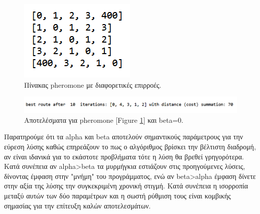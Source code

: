 \begin{figure}
    \centering
    \includegraphics[scale=1]{2947_thesis/pictures/pheromone.png} 
    \caption{Πίνακας pheromone με διαφορετικές επιρροές.}
    \label{15}
\end{figure}
\begin{figure}
    \centering
    \includegraphics[scale=0.65]{2947_thesis/pictures/ex3.png} 
    \caption{Αποτελέσματα για pheromone [Figure \ref{15}] και beta=0.}
    \label{16}
\end{figure}
Παρατηρούμε ότι τα alpha και beta αποτελούν σημαντικούς παράμετρους για την εύρεση λύσης καθώς επηρεάζουν το πως ο αλγόριθμος βρίσκει την βέλτιστη διαδρομή, αν είναι ιδανικά  για το εκάστοτε προβλήματα τότε η λύση θα βρεθεί γρηγορότερα. Κατά συνέπεια αν alpha>beta τα μυρμήγκια εστιάζουν στις προηγούμενες λύσεις, δίνοντας έμφαση στην "μνήμη" του προγράμματος, ενώ αν beta>alpha έμφαση δίνετε στην αξία της λύσης την συγκεκριμένη χρονική στιγμή. Κατά συνέπεια η ισορροπία μεταξύ αυτών των δύο παραμέτρων και η σωστή ρύθμιση τους είναι κομβικής σημασίας για την επίτευξη καλών αποτελεσμάτων. 



